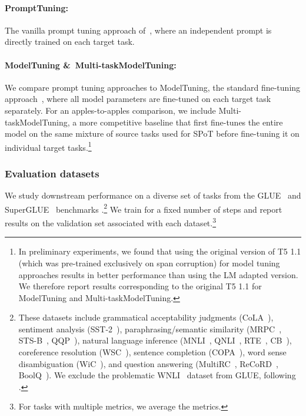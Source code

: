 \paragraph{{\small \sc \textbf{PromptTuning}}:} The vanilla prompt tuning approach of~\citet{BLester21}, where an independent prompt is directly trained on each target task. 

\paragraph{{\small \sc \textbf{ModelTuning \&~Multi-taskModelTuning}}:} We compare prompt tuning approaches to {\small \sc ModelTuning}, the standard fine-tuning approach~\cite{JDevlin19,CRaffel20}, where all model parameters are fine-tuned on each target task separately. For an apples-to-apples comparison, we include {\small \sc Multi-taskModelTuning}, a more competitive baseline that first fine-tunes the entire model on the same mixture of source tasks used for {{\small \sc SPoT}} before fine-tuning it on individual target tasks.{\footnote{
In preliminary experiments, we found that using the original version of {\scriptsize \sc T5 1.1} (which was pre-trained exclusively on span corruption) for model tuning approaches results in better performance than using the LM adapted version. We therefore report results corresponding to the original {\scriptsize \sc T5 1.1} for {\scriptsize \sc ModelTuning} and {\scriptsize \sc Multi-taskModelTuning}.}}
\subsubsection{Evaluation datasets} We study downstream performance on a diverse set of tasks from the {\small \sc GLUE}~\cite{AWang19a} and {\small \sc SuperGLUE}~\cite{AWang19b} benchmarks
.\footnote{These datasets include grammatical acceptability judgments ({\scriptsize \sc CoLA}~\cite{AWarstadt19}), sentiment analysis ({\scriptsize \sc SST-2}~\cite{RSocher13}), paraphrasing/semantic similarity ({\scriptsize \sc MRPC}~\cite{WDolan05}, {\scriptsize \sc STS-B}~\cite{DCer17}, {\scriptsize \sc QQP}~\cite{SIyer17}), natural language inference ({\scriptsize \sc MNLI}~\cite{AWilliams18}, {\scriptsize \sc QNLI}~\cite{AWang19a}, {\scriptsize \sc RTE}~\cite[et seq.]{IDagan06}, {\scriptsize \sc CB}~\cite{MDeMarneffe19}), coreference resolution ({\scriptsize \sc WSC}~\cite{HLevesque12}), sentence completion ({\scriptsize \sc COPA}~\cite{MRoemmele11}), word sense disambiguation ({\scriptsize \sc WiC}~\cite{MPilehvar19}), and question answering ({\scriptsize \sc MultiRC}~\cite{DKhashabi18}, {\scriptsize \sc ReCoRD}~\cite{SZhang18}, {\scriptsize \sc BoolQ}~\cite{CClark19}). We exclude the problematic {\scriptsize \sc WNLI}~\cite{HLevesque12} dataset from {\scriptsize \sc GLUE}, following \citet{JDevlin19}.} 
We train for a fixed number of steps and report results on the validation set associated with each dataset.\footnote{For tasks with multiple metrics, we average the metrics.} 

